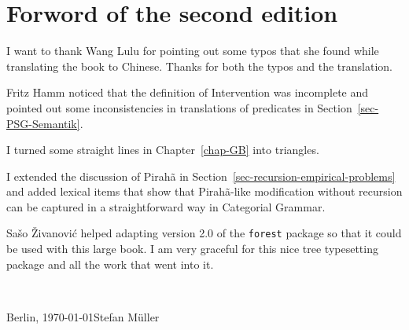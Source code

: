 
\section*{Forword of the second edition}

I want to thank Wang Lulu for pointing out some typos that she found while translating the book to
Chinese. Thanks for both the typos and the translation.

Fritz Hamm noticed that the definition of Intervention was incomplete and pointed out some
inconsistencies in translations of predicates in Section~\ref{sec-PSG-Semantik}.

I turned some straight lines in Chapter~\ref{chap-GB} into triangles.


I extended the discussion of Pirahã in Section~\ref{sec-recursion-empirical-problems} and added lexical items that show that
Pirahã-like modification without recursion can be captured in a straightforward way in Categorial Grammar.

Sašo Živanović helped adapting version 2.0 of the \texttt{forest} package so that it could be used
with this large book. I am very graceful for this nice tree typesetting package and all the work
that went into it.




~\medskip

\noindent
Berlin, \today\hfill Stefan Müller




